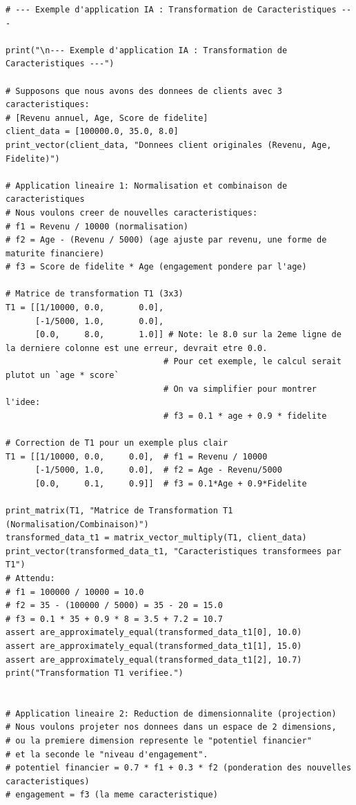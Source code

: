 \documentclass{report}
\begin{document}
\begin{verbatim}
# --- Exemple d'application IA : Transformation de Caracteristiques ---

print("\n--- Exemple d'application IA : Transformation de Caracteristiques ---")

# Supposons que nous avons des donnees de clients avec 3 caracteristiques:
# [Revenu annuel, Age, Score de fidelite]
client_data = [100000.0, 35.0, 8.0]
print_vector(client_data, "Donnees client originales (Revenu, Age, Fidelite)")

# Application lineaire 1: Normalisation et combinaison de caracteristiques
# Nous voulons creer de nouvelles caracteristiques:
# f1 = Revenu / 10000 (normalisation)
# f2 = Age - (Revenu / 5000) (age ajuste par revenu, une forme de maturite financiere)
# f3 = Score de fidelite * Age (engagement pondere par l'age)

# Matrice de transformation T1 (3x3)
T1 = [[1/10000, 0.0,       0.0],
      [-1/5000, 1.0,       0.0],
      [0.0,     8.0,       1.0]] # Note: le 8.0 sur la 2eme ligne de la derniere colonne est une erreur, devrait etre 0.0.
                                # Pour cet exemple, le calcul serait plutot un `age * score`
                                # On va simplifier pour montrer l'idee:
                                # f3 = 0.1 * age + 0.9 * fidelite

# Correction de T1 pour un exemple plus clair
T1 = [[1/10000, 0.0,     0.0],  # f1 = Revenu / 10000
      [-1/5000, 1.0,     0.0],  # f2 = Age - Revenu/5000
      [0.0,     0.1,     0.9]]  # f3 = 0.1*Age + 0.9*Fidelite

print_matrix(T1, "Matrice de Transformation T1 (Normalisation/Combinaison)")
transformed_data_t1 = matrix_vector_multiply(T1, client_data)
print_vector(transformed_data_t1, "Caracteristiques transformees par T1")
# Attendu:
# f1 = 100000 / 10000 = 10.0
# f2 = 35 - (100000 / 5000) = 35 - 20 = 15.0
# f3 = 0.1 * 35 + 0.9 * 8 = 3.5 + 7.2 = 10.7
assert are_approximately_equal(transformed_data_t1[0], 10.0)
assert are_approximately_equal(transformed_data_t1[1], 15.0)
assert are_approximately_equal(transformed_data_t1[2], 10.7)
print("Transformation T1 verifiee.")


# Application lineaire 2: Reduction de dimensionnalite (projection)
# Nous voulons projeter nos donnees dans un espace de 2 dimensions,
# ou la premiere dimension represente le "potentiel financier"
# et la seconde le "niveau d'engagement".
# potentiel financier = 0.7 * f1 + 0.3 * f2 (ponderation des nouvelles caracteristiques)
# engagement = f3 (la meme caracteristique)


\end{verbatim}
\end{document}
